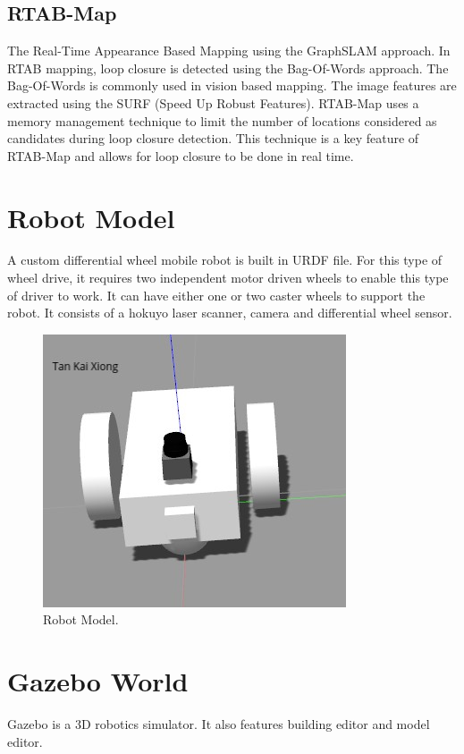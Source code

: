 \documentclass[10pt,journal,compsoc]{IEEEtran}
\begin{document}
\subsection{RTAB-Map}
The Real-Time Appearance Based Mapping using the GraphSLAM approach. In RTAB mapping, loop closure is detected using the Bag-Of-Words approach. The Bag-Of-Words is commonly used in vision based mapping. The image features are extracted using the SURF (Speed Up Robust Features). RTAB-Map\cite{rtabmap_ros} uses a memory management technique to limit the number of locations considered as candidates during loop closure detection. This technique is a key feature of RTAB-Map and allows for loop closure to be done in real time.

\section{Robot Model}
A custom differential wheel mobile robot is built in URDF file.  For this type of wheel drive,
it requires two independent motor driven wheels to enable this type of driver to work. It can have either one or two caster wheels to support the robot. It consists of a hokuyo laser scanner, camera and differential wheel sensor.

\begin{figure}[thpb]
      \centering
      \includegraphics[scale=0.5]{custom_robot.png}
      \caption{Robot Model.}
      \label{fig:robot1}
\end{figure}

\section{Gazebo World}
Gazebo is a 3D robotics simulator. It also features building editor and model editor.
\end{document}
